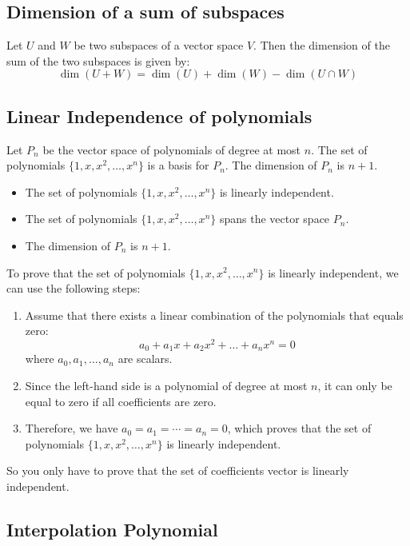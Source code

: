\QED

\subsection{Dimension of a sum of subspaces}
Let \(U\) and \(W\) be two subspaces of a vector space \(V\). Then the dimension of the sum of the two subspaces is given by:
\[
    \dim(U + W) = \dim(U) + \dim(W) - \dim(U \cap W)    
\]

\subsection{Linear Independence of polynomials}
Let \(P_n\) be the vector space of polynomials of degree at most \(n\). The set of polynomials \(\{1, x, x^2, \ldots, x^n\}\) is a basis for \(P_n\).
The dimension of \(P_n\) is \(n + 1\).
\begin{itemize}[label=\(-\)]
    \item The set of polynomials \(\{1, x, x^2, \ldots, x^n\}\) is linearly independent.
    \item The set of polynomials \(\{1, x, x^2, \ldots, x^n\}\) spans the vector space \(P_n\).
    \item The dimension of \(P_n\) is \(n + 1\).
\end{itemize}

To prove that the set of polynomials \(\{1, x, x^2, \ldots, x^n\}\) is linearly independent, 
we can use the following steps:

\begin{enumerate}
    \item Assume that there exists a linear combination of the polynomials that equals zero:
    \[
        a_0 + a_1 x + a_2 x^2 + \ldots + a_n x^n = 0
    \]
    where \(a_0, a_1, \ldots, a_n\) are scalars.
    \item Since the left-hand side is a polynomial of degree at most \(n\), it can only be equal to zero if all coefficients are zero.
    \item Therefore, we have \(a_0 = a_1 = \cdots = a_n = 0\), which 
	proves that the set of polynomials \(\{1, x, x^2, \ldots, x^n\}\) is linearly independent.
\end{enumerate}

So you only have to prove that the set of coefficients vector is linearly independent.

\subsection{Interpolation Polynomial}

